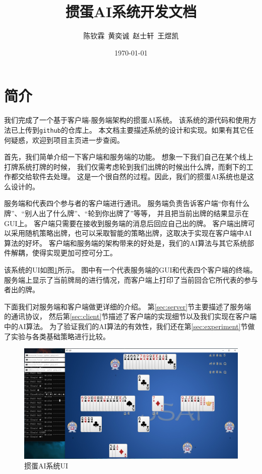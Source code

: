 \documentclass[a4paper]{ctexart}
\title{\textbf{掼蛋AI系统开发文档}}
\author{陈钦霖\ 黄奕诚\ 赵士轩\ 王煜凯}
\date{\today}
\begin{document}
\maketitle

\section{简介}
我们完成了一个基于客户端-服务端架构的掼蛋AI系统。
该系统的源代码和使用方法已上传到\texttt{github}的仓库上\cite{guandan-ai}。
本文档主要描述系统的设计和实现。如果有其它任何疑惑，欢迎到项目主页进一步查阅。

首先，我们简单介绍一下客户端和服务端的功能。
想象一下我们自己在某个线上打牌系统打牌的时候，
我们仅需考虑轮到我们出牌的时候出什么牌，而剩下的工作都交给软件去处理。
这是一个很自然的过程。因此，我们的掼蛋AI系统也是这么设计的。

服务端和代表四个参与者的客户端进行通讯。
服务端负责告诉客户端``你有什么牌''、``别人出了什么牌''、``轮到你出牌了''等等，
并且把当前出牌的结果显示在GUI上。
客户端只需要在接收到服务端的消息后回应自己出的牌。
客户端出牌可以采用随机策略出牌，也可以采取智能的策略出牌，这取决于实现在客户端中AI算法的好坏。
客户端和服务端的架构带来的好处是，我们的AI算法与其它系统部件解耦，使得实现更加可控可分工。

该系统的UI如图\ref{fig:ui}所示。
图中有一个代表服务端的GUI和代表四个客户端的终端。
服务端上显示了当前牌局的进行情况，而客户端上打印了当前回合它所代表的参与者出的牌。

下面我们对服务端和客户端做更详细的介绍。
第\ref{sec:server}节主要描述了服务端的通讯协议，
然后第\ref{sec:client}节描述了客户端的实现细节以及我们实现在客户端中的AI算法。
为了验证我们的AI算法的有效性，我们还在第\ref{sec:experiment}节做了实验与各类基础策略进行比较。

\begin{figure}
  \centering
  \includegraphics[width=\linewidth]{images/ui}
  \caption{掼蛋AI系统UI}
  \label{fig:ui}
\end{figure}
\end{document}
